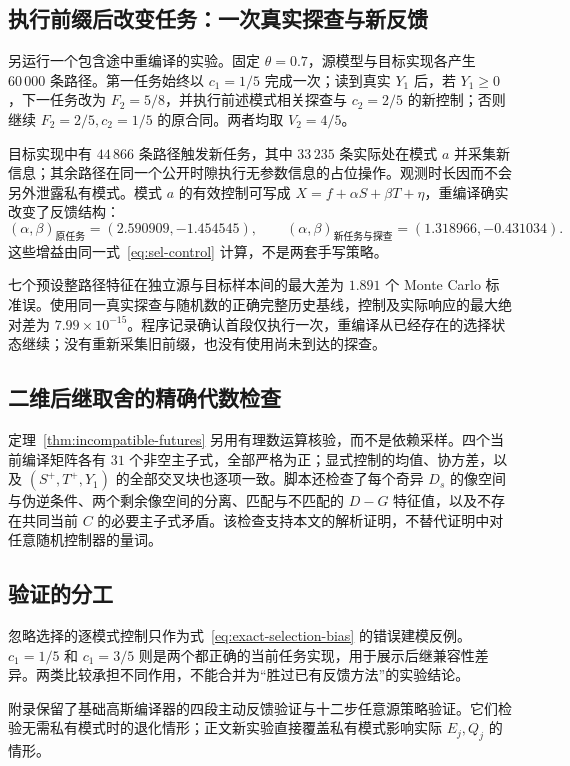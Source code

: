 \documentclass[UTF8,fontset=fandol,11pt,a4paper]{ctexart}
\theoremstyle{definition}
\theoremstyle{remark}
\numberwithin{equation}{section}
\begin{document}
\subsection{执行前缀后改变任务：一次真实探查与新反馈}
另运行一个包含途中重编译的实验。固定 $\theta=0.7$，源模型与目标实现各产生 $60\,000$ 条路径。第一任务始终以 $c_1=1/5$ 完成一次；读到真实 $Y_1$ 后，若 $Y_1\ge0$，下一任务改为 $F_2=5/8$，并执行前述模式相关探查与 $c_2=2/5$ 的新控制；否则继续 $F_2=2/5,c_2=1/5$ 的原合同。两者均取 $V_2=4/5$。

目标实现中有 $44\,866$ 条路径触发新任务，其中 $33\,235$ 条实际处在模式 $a$ 并采集新信息；其余路径在同一个公开时隙执行无参数信息的占位操作。观测时长因而不会另外泄露私有模式。模式 $a$ 的有效控制可写成 $X=f+\alpha S+\beta T+\eta$，重编译确实改变了反馈结构：
\begin{equation}
 (\alpha,\beta)_{\text{原任务}}=(2.590909,-1.454545),\qquad
 (\alpha,\beta)_{\text{新任务与探查}}=(1.318966,-0.431034).
\end{equation}
这些增益由同一式~\eqref{eq:sel-control} 计算，不是两套手写策略。

七个预设整路径特征在独立源与目标样本间的最大差为 $1.891$ 个 Monte Carlo 标准误。使用同一真实探查与随机数的正确完整历史基线，控制及实际响应的最大绝对差为 $7.99\times10^{-15}$。程序记录确认首段仅执行一次，重编译从已经存在的选择状态继续；没有重新采集旧前缀，也没有使用尚未到达的探查。

\subsection{二维后继取舍的精确代数检查}
定理~\ref{thm:incompatible-futures} 另用有理数运算核验，而不是依赖采样。四个当前编译矩阵各有 $31$ 个非空主子式，全部严格为正；显式控制的均值、协方差，以及 $(S^+,T^+,Y_1)$ 的全部交叉块也逐项一致。脚本还检查了每个奇异 $D_s$ 的像空间与伪逆条件、两个剩余像空间的分离、匹配与不匹配的 $D-G$ 特征值，以及不存在共同当前 $C$ 的必要主子式矛盾。该检查支持本文的解析证明，不替代证明中对任意随机控制器的量词。


\subsection{验证的分工}
忽略选择的逐模式控制只作为式~\eqref{eq:exact-selection-bias} 的错误建模反例。$c_1=1/5$ 和 $c_1=3/5$ 则是两个都正确的当前任务实现，用于展示后继兼容性差异。两类比较承担不同作用，不能合并为“胜过已有反馈方法”的实验结论。

附录保留了基础高斯编译器的四段主动反馈验证与十二步任意源策略验证。它们检验无需私有模式时的退化情形；正文新实验直接覆盖私有模式影响实际 $E_j,Q_j$ 的情形。
\end{document}
